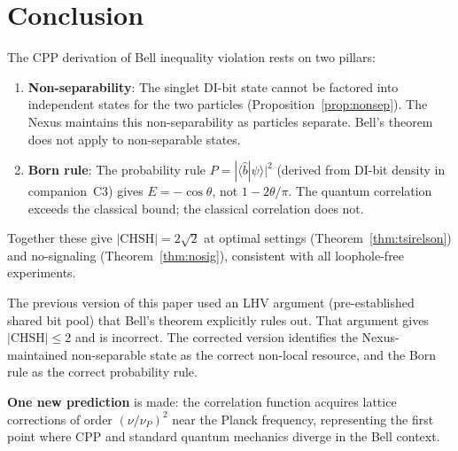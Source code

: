 \documentclass[11pt,a4paper]{article}
\begin{document}
\section{Conclusion}
\label{sec:conclusion}

The CPP derivation of Bell inequality violation rests on two pillars:

\begin{enumerate}
\item \textbf{Non-separability}: The singlet DI-bit state cannot be
  factored into independent states for the two particles
  (Proposition~\ref{prop:nonsep}).  The Nexus maintains this
  non-separability as particles separate.  Bell's theorem does not
  apply to non-separable states.

\item \textbf{Born rule}: The probability rule $P = |\langle\hat{b}
  |\psi\rangle|^2$ (derived from DI-bit density in companion~C3)
  gives $E = -\cos\theta$, not $1 - 2\theta/\pi$.  The quantum
  correlation exceeds the classical bound; the classical correlation
  does not.
\end{enumerate}

Together these give $|\mathrm{CHSH}| = 2\sqrt{2}$ at optimal settings
(Theorem~\ref{thm:tsirelson}) and no-signaling (Theorem~\ref{thm:nosig}),
consistent with all loophole-free experiments.

The previous version of this paper used an LHV argument (pre-established
shared bit pool) that Bell's theorem explicitly rules out.  That argument
gives $|\mathrm{CHSH}| \leq 2$ and is incorrect.  The corrected version
identifies the Nexus-maintained non-separable state as the correct
non-local resource, and the Born rule as the correct probability rule.

\textbf{One new prediction} is made: the correlation function acquires
lattice corrections of order $(\nu/\nu_P)^2$ near the Planck frequency,
representing the first point where CPP and standard quantum mechanics
diverge in the Bell context.
\end{document}
